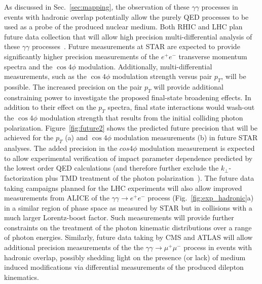 \documentclass[12pt,epjc3]{svjour3}\sloppy
\begin{document}
As discussed in Sec.~\ref{sec:mapping}, the observation of these $\gamma\gamma$ processes in events with hadronic overlap potentially allow the purely QED processes to be used as a probe of the produced nuclear medium. Both RHIC and LHC plan future data collection that will allow high precision multi-differential analysis of these $\gamma\gamma$ processes~\cite{SN0755STARBeam,ProspectsMeasurementsPhotonInduced}. Future measurements at STAR are expected to provide significantly higher precision measurements of the $e^+e^-$ transverse momentum spectra and the $\cos4\phi$ modulation. Additionally, multi-differential measurements, such as the $\cos4\phi$ modulation strength versus pair $p_T$, will be possible. The increased precision on the pair $p_T$ will provide additional constraining power to investigate the proposed final-state broadening effects. In addition to their effect on the $p_T$ spectra, final state interactions would wash-out the $\cos4\phi$ modulation strength that results from the initial colliding photon polarization. Figure~\ref{fig:future2} shows the predicted future precision that will be achieved for the $p_T$ (a) and $\cos4\phi$ modulation measurements (b) in future STAR analyses. The added precision in the $cos4\phi$ modulation measurement is expected to allow experimental verification of impact parameter dependence predicted by the lowest order QED calculations (and therefore further exclude the $k_\perp$-factorization plus TMD treatment of the photon polarization~\cite{li_probing_2019,SuperChic3}). The future data taking campaigns planned for the LHC experiments will also allow improved measurements from ALICE of the $\gamma\gamma \rightarrow e^+e^-$ process (Fig.~\ref{fig:exp_hadronic}a) in a similar region of phase space as measured by STAR but in collisions with a much larger Lorentz-boost factor. Such measurements will provide further constraints on the treatment of the photon kinematic distributions over a range of photon energies. Similarly, future data taking by CMS and ATLAS will allow additional precision measurements of the the $\gamma\gamma \rightarrow \mu^+\mu^-$ process in events with hadronic overlap, possibly shedding light on the presence (or lack) of medium induced modifications via differential measurements of the produced dilepton kinematics.
\end{document}
